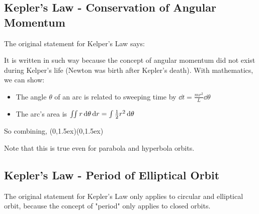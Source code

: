 \documentclass[class=article, crop=false, 12pt]{standalone}
\begin{document}





\subsection{Kepler's  Law - Conservation of Angular Momentum}

The original statement for Kelper's  Law says:


It is written in such way because the concept of angular momentum did not exist during Kelper's life 
(Newton was birth after Kepler's death).
With mathematics, we can show:

\begin{itemize}
    \item The angle $\theta$ of an arc is related to sweeping time by $\dd{t} = \frac{mr^2}{L}\dd{\theta}$
    \item The arc's area is $\iint r\dd{\theta}\dd{r} = \int \frac{1}{2} r^2 \dd{\theta}$
\end{itemize}

So combining,
{(0,1.5ex)}{(0,1.5ex)}

Note that this is true even for parabola and hyperbola orbits.





\subsection{Kepler's  Law - Period of Elliptical Orbit}

The original statement for Kepler's  Law only applies to circular and elliptical orbit, 
because the concept of "period" only applies to closed orbits. 

\begin{center}
    \begin{minipage}{0.9\textwidth}
    \end{minipage}
\end{center}
\end{document}
